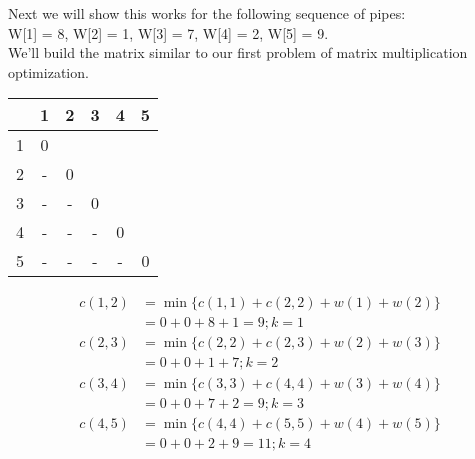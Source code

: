 \documentclass[12pt]{article}
\begin{document}
Next we will show this works for the following sequence of pipes: \\
W[1] = 8, W[2] = 1, W[3] = 7, W[4] = 2, W[5] = 9.
\\
We'll build the matrix similar to our first problem of matrix multiplication optimization.

\begin{table}[h]
\centering
\begin{tabular}{|c|c|c|c|c|c|}
\hline
\multicolumn{1}{|l|}{} & \multicolumn{1}{|l|}{1} & \multicolumn{1}{l|}{2} & \multicolumn{1}{l|}{3} & \multicolumn{1}{l|}{4} & \multicolumn{1}{l|}{5} \\ \hline
1&0                       &                      &                       &                       &                   \\ \hline
2&-                       & 0                     &                       &                       &                   \\ \hline
3&-                       & -                     & 0                     &                       &                       \\ \hline
4&-                       & -                     & -                     & 0                     &                       \\ \hline
5&-                       & -                     & -                     & -                     &    0                   \\ \hline
\end{tabular}
\end{table}

\begin{align*}
c(1,2) & = \min \{ c(1,1) + c(2,2) + w(1) + w(2)\} \\
           & = 0 + 0 + 8 + 1 = 9; k=1\\
c(2,3) & = \min \{c(2,2) + c(2,3) + w(2) + w(3)\} \\
          & = 0 + 0 + 1 + 7; k=2\\
c(3,4) & = \min \{c(3,3) + c(4,4) + w(3) + w(4)\} \\
          &= 0 + 0 +7 + 2 = 9; k=3\\
c(4,5) &= \min\{c(4,4) + c(5,5) + w(4) + w(5)\}\\
          &= 0 + 0 + 2 + 9 = 11; k=4
\end{align*}
\end{document}
